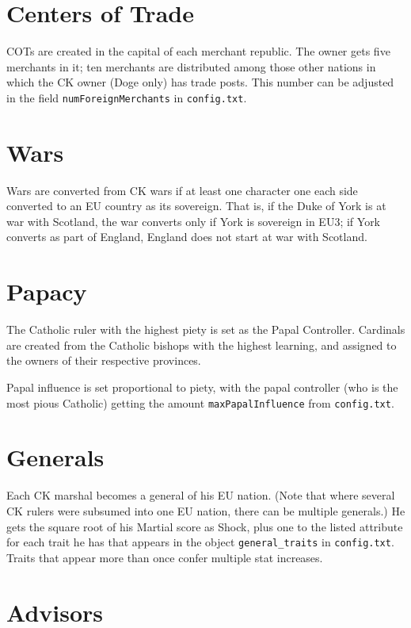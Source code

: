 \documentclass[12pt,ebook,oneside]{book}
\begin{document}
\section{Centers of Trade}

COTs are created in the capital of each merchant republic. The owner
gets five merchants in it; ten merchants are distributed among those
other nations in which the CK owner (Doge only) has trade posts. This
number can be adjusted in the field \verb|numForeignMerchants| in
\verb|config.txt|. 

\section{Wars}

Wars are converted from CK wars if at least one character one each
side converted to an EU country as its sovereign. That is, if the Duke
of York is at war with Scotland, the war converts only if York is
sovereign in EU3; if York converts as part of England, England does
not start at war with Scotland. 

\section{Papacy}

The Catholic ruler with the highest piety is set as the Papal
Controller. Cardinals are created from the Catholic bishops with the
highest learning, and assigned to the owners of their respective
provinces. 

Papal influence is set proportional to piety, with the papal
controller (who is the most pious Catholic) getting the amount
\verb|maxPapalInfluence| from \verb|config.txt|. 

\section{Generals}

Each CK marshal becomes a general of his EU nation. (Note that where
several CK rulers were subsumed into one EU nation, there can be
multiple generals.) He gets the
square root of his Martial score as Shock, plus one to the listed
attribute for each trait he has that appears in the object
\verb|general_traits| in \verb|config.txt|. Traits that appear more
than once confer multiple stat increases. 

\section{Advisors}
\end{document}
